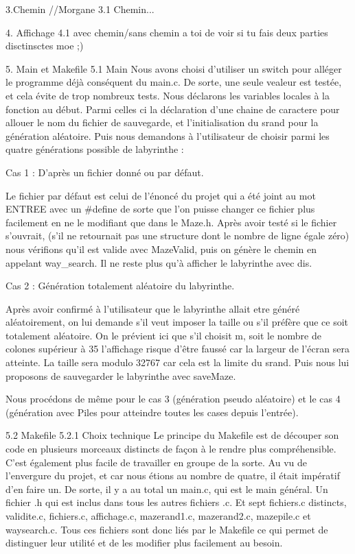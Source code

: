 3.Chemin //Morgane
3.1 Chemin...

4. Affichage 
4.1 avec chemin/sans chemin a toi de voir si tu fais deux parties disctinsctes moe ;)

5. Main et Makefile
5.1 Main
Nous avons choisi d'utiliser un switch pour alléger le programme déjà conséquent du main.c. De sorte, une seule vealeur est testée, et cela évite de trop nombreux tests. Nous déclarons les variables locales à la fonction au début. Parmi celles ci la déclaration d'une chaine de caractere pour allouer le nom du fichier de sauvegarde, et l'initialisation du srand pour la génération aléatoire.
Puis nous demandons à l'utilisateur de choisir parmi les quatre générations possible de labyrinthe :

Cas 1 : D'après un fichier donné ou par défaut.

Le fichier par défaut est celui de l'énoncé du projet qui a été joint au mot ENTREE avec un #define de sorte que l'on puisse changer ce fichier plus facilement en ne le modifiant que dans le Maze.h. Après avoir testé si le fichier s'ouvrait, (s'il ne retournait pas une structure dont le nombre de ligne égale zéro) nous vérifions qu'il est valide avec MazeValid, puis on génère le chemin en appelant way_search. Il ne reste plus qu'à afficher le labyrinthe avec dis.

Cas 2 : Génération totalement aléatoire du labyrinthe.

Après avoir confirmé à l'utilisateur que le labyrinthe allait etre généré aléatoirement, on lui demande s'il veut imposer la taille ou s'il préfère que ce soit totalement aléatoire. On le prévient ici que s'il choisit m, soit le nombre de colones supérieur à 35 l'affichage risque d'être faussé car la largeur de l'écran sera atteinte. La taille sera modulo 32767 car cela est la limite du srand. Puis nous lui proposons de sauvegarder le labyrinthe avec saveMaze.

Nous procédons de même pour le cas 3 (génération pseudo aléatoire) et le cas 4 (génération avec Piles pour atteindre toutes les cases depuis l'entrée).

5.2 Makefile
5.2.1 Choix technique
Le principe du Makefile est de découper son code en plusieurs morceaux distincts de façon à le rendre plus compréhensible.
C'est également plus facile de travailler en groupe de la sorte. 
Au vu de l'envergure du projet, et car nous étions au nombre de quatre, il était impératif d'en faire un. 
De sorte, il y a au total un main.c, qui est le main général. Un fichier .h qui est inclus dans tous les autres fichiers .c.  
Et sept fichiers.c distincts, validite.c, fichiers.c, affichage.c, mazerand1.c, mazerand2.c, mazepile.c et waysearch.c.
Tous ces fichiers sont donc liés par le Makefile ce qui permet de distinguer leur utilité et de les modifier plus facilement au besoin.

